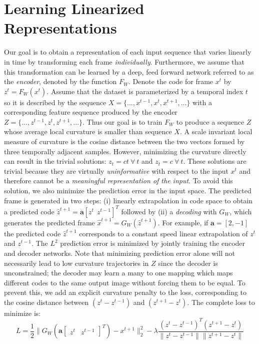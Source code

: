 \section{Learning Linearized Representations} 
\label{sec:main}
Our goal is to obtain a representation of each input sequence that varies linearly in time by transforming each frame \emph{individually}. Furthermore, we assume that this transformation can be learned by a deep, feed forward network referred to as the \emph{encoder}, denoted by the function $F_W$.
Denote the code for frame $x^t$ by $z^t = F_W(x^t)$. Assume that the dataset is parameterized by a temporal index $t$ so it is described by the sequence $X = \{...,x^{t-1},x^t,x^{t+1},...\}$ with a corresponding feature sequence produced by the encoder $Z = \{...,z^{t-1},z^t,z^{t+1},...\}$. Thus our goal is to train $F_W$ to produce a sequence $Z$ whose average local curvature is smaller than sequence $X$. A scale invariant local measure of curvature is the cosine distance between the two vectors formed by three temporally adjacent samples. However, minimizing the curvature directly can result in the trivial solutions: $z_t=ct~\forall~t$ and $z_t=c~\forall~t$. These solutions are trivial because they are virtually \emph{uninformative} with respect to the input $x^t$ and therefore cannot be a \emph{meaningful representation of the input}. To avoid this solution, we also minimize the prediction error in the input space. The predicted frame is generated in two steps: (i) linearly extrapolation in code space to obtain a predicted code $\hat z^{t+1} = \mathbf a [z^t~~z^{t-1}]^T$ followed by (ii) a \emph{decoding} with $G_W$, which generates the predicted frame $\hat x^{t+1} = G_W(\hat z^{t+1})$. For example, if $\mathbf{a} = [2,-1]$ the predicted code $\hat z^{t+1}$ corresponds to a constant speed linear extrapolation of $z^t$ and $z^{t-1}$. The $L^2$ prediction error is minimized by jointly training the encoder and decoder networks. Note that minimizing prediction error alone will not necessarily lead to low curvature trajectories in $Z$ since the decoder is unconstrained; the decoder may learn a many to one mapping which maps different codes to the same output image without forcing them to be equal. To prevent this, we add an explicit curvature penalty to the loss, corresponding to the cosine distance between $(z^t-z^{t-1})$ and $(z^{t+1}-z^t)$.    
The complete loss to minimize is: 
\begin{equation}
L = \frac{1}{2}\| G_W(\mathbf a \begin{bmatrix}z^t&z^{t-1}\end{bmatrix}^T) - x^{t+1} \|^2_2 - \lambda \frac{(z^t - z^{t-1})^T(z^{t+1} - z^t)}{\|z^t-z^{t-1}\| \|z^{t+1} - z^t\|}
\label{eqn:loss} 
\end{equation} 

